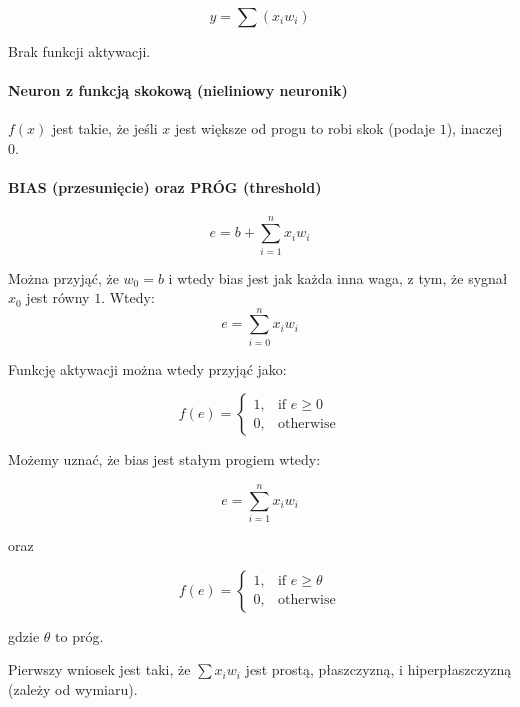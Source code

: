 \begin{equation}
 y = \sum(x_i w_i)
\end{equation}

Brak funkcji aktywacji.

\paragraph{Neuron z funkcją skokową (nieliniowy neuronik)}

$f(x)$ jest takie, że jeśli $x$ jest większe od progu to robi skok (podaje $1$), inaczej $0$.

\paragraph{BIAS (przesunięcie) oraz PRÓG (threshold)}

\begin{equation}
 e = b + \sum_{i=1}^n x_i w_i
\end{equation}

Można przyjąć, że $w_0 = b$ i wtedy bias jest jak każda inna waga, z tym, że sygnał $x_0$ jest równy $1$.
Wtedy:
\begin{equation}
 e = \sum_{i=0}^n x_i w_i
\end{equation}

Funkcję aktywacji można wtedy przyjąć jako:

\begin{equation}
  f(e)= 
\begin{cases}
    1,& \text{if } e \ge 0 \\
    0,              & \text{otherwise}
\end{cases}
\end{equation}

Możemy uznać, że bias jest stałym progiem wtedy:

\begin{equation}
 e = \sum_{i=1}^n x_i w_i
\end{equation}

oraz

\begin{equation}
  f(e)= 
\begin{cases}
    1,& \text{if } e \ge \theta \\
    0,              & \text{otherwise}
\end{cases}
\end{equation}

gdzie $\theta$ to próg.

Pierwszy wniosek jest taki, że $\sum x_i w_i$ jest prostą, płaszczyzną, i hiperpłaszczyzną (zależy od wymiaru).

